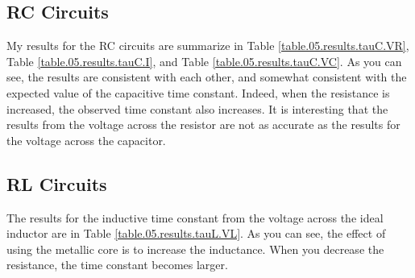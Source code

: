 \subsection{RC Circuits}
My results for the RC circuits are summarize in Table \ref{table.05.results.tauC.VR}, Table \ref{table.05.results.tauC.I}, and Table \ref{table.05.results.tauC.VC}. As you can see, the results are consistent with each other, and somewhat consistent with the expected value of the capacitive time constant. Indeed, when the resistance is increased, the observed time constant also increases. It is interesting that the results from the voltage across the resistor are not as accurate as the results for the voltage across the capacitor.
\subsection{RL Circuits}
The results for the inductive time constant from the voltage across the ideal inductor are in Table \ref{table.05.results.tauL.VL}. As you can see, the effect of using the metallic core is to increase the inductance. When you decrease the resistance, the time constant becomes larger.
